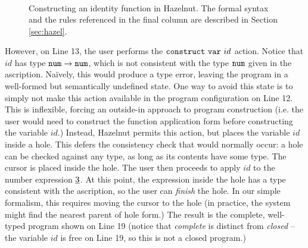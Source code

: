 \begin{figure}[t!]
\[\begin{array}{|c||c|l||l|l|}
\end{array}
\]
\caption{Constructing an identity function in Hazelnut. The formal syntax and the rules referenced in the final column are described in Section \ref{sec:hazel}.}
\label{fig:first-example}
\end{figure}

However, on Line 13, the user performs the $\mathtt{construct}~\mathtt{var}~id$ action. Notice that $id$ has type $\texttt{num} \rightarrow \texttt{num}$, which is not consistent with the type $\texttt{num}$ given in the ascription. Na\"ively, this would produce a type error, leaving the program in a well-formed but semantically undefined state. One way to avoid this state is to simply not make this action available in the program configuration on Line 12. This is inflexible, forcing an outside-in approach to program construction (i.e. the user would need to construct the function application form before constructing the variable $id$.) Instead, Hazelnut permits this action, but places the variable $id$ inside a hole. This defers the consistency check that would normally occur: a hole can be checked against any type, as long as its contents have some type. The cursor is placed inside the hole. The user then proceeds to apply $id$ to the number expression $\underline{3}$. At this point, the expression inside the hole has a type consistent with the ascription, so the user can \emph{finish} the hole. In our simple formalism, this requires moving the cursor to the hole (in practice, the system might find the nearest parent of hole form.) The result is the complete, well-typed program shown on Line 19 (notice that \emph{complete} is distinct from \emph{closed} -- the variable $id$ is free on Line 19, so this is not a closed program.)

